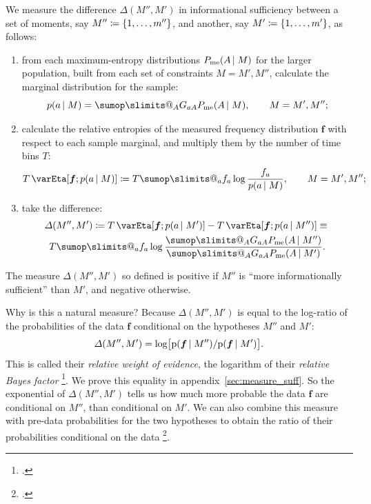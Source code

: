 \documentclass[\ifafour a4paper,12pt,\else a5paper,10pt,\fi%
onecolumn,oneside,article,%
british%
]{memoir}
\makeatletter
\theoremstyle{remark}
\theoremstyle{innote}
\def\sum{\DOTSI\sumop\slimits@}
\newcommand*{\citep}{\footcites}
\newcommand*{\defd}{\coloneqq}
\DeclarePairedDelimiter\set{\{}{\}}
\newcommand*{\pf}{\mathrm{p}}%
\renewcommand*{\|}{\nonscript\,\vert\nonscript\;\mathopen{}}
\newcommand*{\sect}{\S}%
\newcommand*{\chap}{ch.}%
\newcommand*{\chaps}{chs}%
\newcommand*{\cf}{{cf.}}
\newcommand*{\yG}{G}
\newcommand*{\yAv}{A}
\newcommand*{\yav}{a}
\newcommand*{\yff}{f}
\newcommand*{\yf}{\bm{\yff}}
\newcommand*{\ya}{\yav}%
\newcommand*{\yA}{\yAv}%
\newcommand*{\px}{P_{\text{me}}}
\newcommand*{\pxx}{p}
\newcommand*{\ydi}{\varDelta}
\newcommand*{\sh}{\mathrm{\varEta}}
\makeatother
\begin{document}
We measure the difference $\ydi(M'',M')$ in informational sufficiency
between a set of moments, say $M''\defd\set{1,\dotsc,m''}$, and another, say
$M'\defd \set{1,\dotsc,m'}$, as follows:
\begin{enumerate}[label=(\roman*)]
\item from each maximum-entropy distributions $\px(\yA \| M)$ for the larger
  population, built from each set of constraints $M=M',M''$, calculate the
  marginal distribution for the sample:
\begin{equation}
  \label{eq:sample_marginal}
  \pxx(\ya \| M) = \sum_{\yA}\yG_{\ya \yA}\px(\yA \| M),
  \qquad M=M',M'';
\end{equation}
\item calculate the relative entropies of the measured frequency
  distribution $\yf$ with respect to each sample marginal, and multiply
  them by the number of time bins $T$:
  \begin{equation}
    \label{eq:relentropy_T}
    T\,\sh[\yf; \pxx(\ya \| M)] \defd  T  \sum_{\ya} \yff_{\ya} \log\frac{\yff_{\ya}}{
      \pxx(\ya \| M)},
    \qquad M=M',M'';    
  \end{equation}
\item take the difference: 
\begin{multline}
  \label{eq:measure_suffic}
  \ydi(M'',M') \defd
  T \,\sh[\yf; \pxx(\ya \| M')]
  -
  T \,\sh[\yf; \pxx(\ya \| M'')]
  \equiv{}\\
T  \sum_{\ya} \yff_{\ya} \log\frac{
  \sum_{\yA}\yG_{\ya\yA}\px(\yA \| M'')}{
  \sum_{\yA}\yG_{\ya\yA}\px(\yA \| M')}.
\end{multline}
\end{enumerate}
The measure $\ydi(M'',M')$ so defined is positive if $M''$ is \enquote{more
  informationally sufficient} than $M'$, and negative otherwise.

Why is this a natural measure? Because $\ydi(M'',M')$ is equal to the
log-ratio of the probabilities of the data $\yf$ conditional on the
hypotheses $M''$ and $M'$:
\begin{equation}
  \label{eq:bayes_factor}
  \ydi(M'',M') =
  \log\bigl[\pf(\yf \| M'')/
  \pf(\yf \| M')\bigr].
\end{equation}
This is called their \emph{relative weight of evidence}, the logarithm of
their \emph{relative Bayes factor}
\citep[\chap~6]{good1950}{good1975,good1981,good1985,good1983}[\sect~1.4]{osteyeeetal1974}{mackay1992,kassetal1995}[see
also][p.~421]{jeffreys1936}[\chaps~V, VI, A]{jeffreys1939_r1983}. We prove
this equality in appendix~\ref{sec:measure_suff}. So the exponential of
$\ydi(M'',M')$ tells us how much more probable the data $\yf$ are
conditional on $M''$, than conditional on $M'$. We can also combine this
measure with pre-data probabilities for the two hypotheses to obtain the
ratio of their probabilities conditional on the data
\citep[\cf][]{bretthorst2013}.
\end{document}

